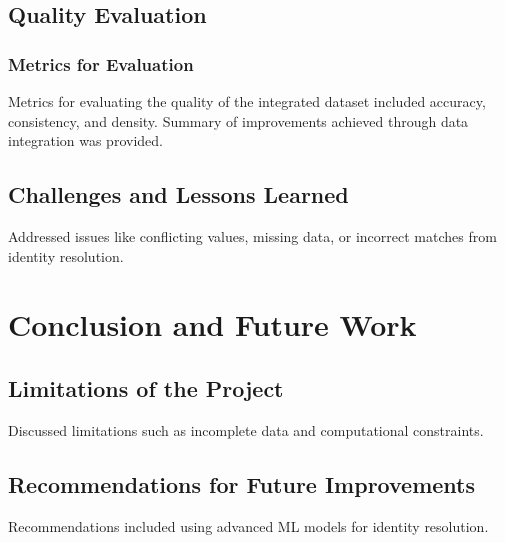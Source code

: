 \documentclass[runningheads]{llncs}
\begin{document}
\subsection{Quality Evaluation}
\subsubsection{Metrics for Evaluation}
Metrics for evaluating the quality of the integrated dataset included accuracy, consistency, and density. Summary of improvements achieved through data integration was provided.

\subsection{Challenges and Lessons Learned}
Addressed issues like conflicting values, missing data, or incorrect matches from identity resolution.

\section{Conclusion and Future Work}
\subsection{Limitations of the Project}
Discussed limitations such as incomplete data and computational constraints.

\subsection{Recommendations for Future Improvements}
Recommendations included using advanced ML models for identity resolution.


 
\end{document}
